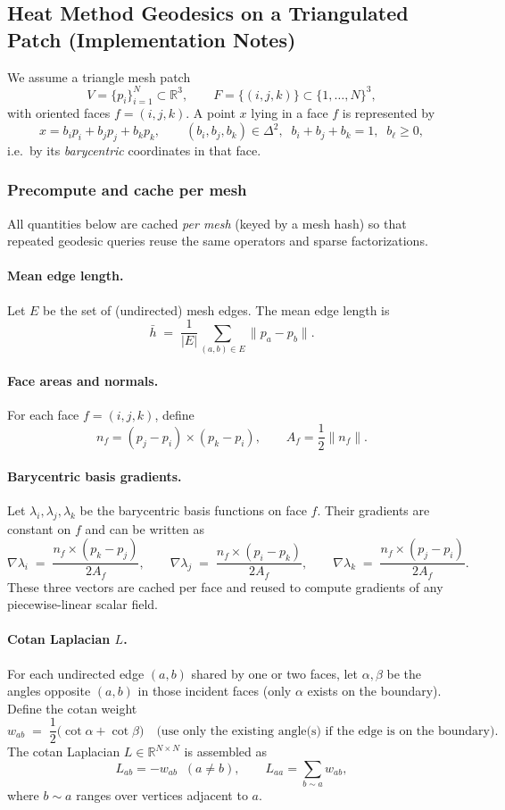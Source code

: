 \documentclass[12pt,a4paper]{article}
\theoremstyle{plain}
\theoremstyle{definition}
\begin{document}
	\subsection*{Heat Method Geodesics on a Triangulated Patch (Implementation Notes)}
	
	We assume a triangle mesh patch
	\[
	V=\{p_i\}_{i=1}^N\subset\mathbb{R}^3,\qquad
	F=\{(i,j,k)\}\subset\{1,\dots,N\}^3,
	\]
	with oriented faces \(f=(i,j,k)\). A point \(x\) lying in a face \(f\) is represented by
	\[
	x = b_i p_i + b_j p_j + b_k p_k,
	\qquad
	(b_i,b_j,b_k)\in\Delta^2,\;\; b_i+b_j+b_k=1,\;\; b_\ell\ge 0,
	\]
	i.e.\ by its \emph{barycentric} coordinates in that face.
	
	\subsubsection*{Precompute and cache per mesh}
	
	All quantities below are cached \emph{per mesh} (keyed by a mesh hash) so that repeated geodesic queries reuse the same operators and sparse factorizations.
	
	\paragraph{Mean edge length.}
	Let \(E\) be the set of (undirected) mesh edges. The mean edge length is
	\[
	\bar{h} \;=\; \frac{1}{|E|}\sum_{(a,b)\in E}\|p_a-p_b\|.
	\]
	
	\paragraph{Face areas and normals.}
	For each face \(f=(i,j,k)\), define
	\[
	n_f=(p_j-p_i)\times(p_k-p_i),\qquad
	A_f=\frac{1}{2}\|n_f\|.
	\]
	
	\paragraph{Barycentric basis gradients.}
	Let \(\lambda_i,\lambda_j,\lambda_k\) be the barycentric basis functions on face \(f\).
	Their gradients are constant on \(f\) and can be written as
	\[
	\nabla \lambda_i \;=\; \frac{n_f \times (p_k-p_j)}{2A_f},\qquad
	\nabla \lambda_j \;=\; \frac{n_f \times (p_i-p_k)}{2A_f},\qquad
	\nabla \lambda_k \;=\; \frac{n_f \times (p_j-p_i)}{2A_f}.
	\]
	These three vectors are cached per face and reused to compute gradients of any
	piecewise-linear scalar field.
	
	\paragraph{Cotan Laplacian \(L\).}
	For each undirected edge \((a,b)\) shared by one or two faces, let \(\alpha,\beta\)
	be the angles opposite \((a,b)\) in those incident faces (only \(\alpha\) exists on the boundary).
	Define the cotan weight
	\[
	w_{ab} \;=\; \frac{1}{2}\bigl(\cot\alpha + \cot\beta\bigr)
	\quad\text{(use only the existing angle(s) if the edge is on the boundary).}
	\]
	The cotan Laplacian \(L\in\mathbb{R}^{N\times N}\) is assembled as
	\[
	L_{ab}=-w_{ab}\;\;(a\neq b),\qquad
	L_{aa}=\sum_{b\sim a} w_{ab},
	\]
	where \(b\sim a\) ranges over vertices adjacent to \(a\).
	
\end{document}
